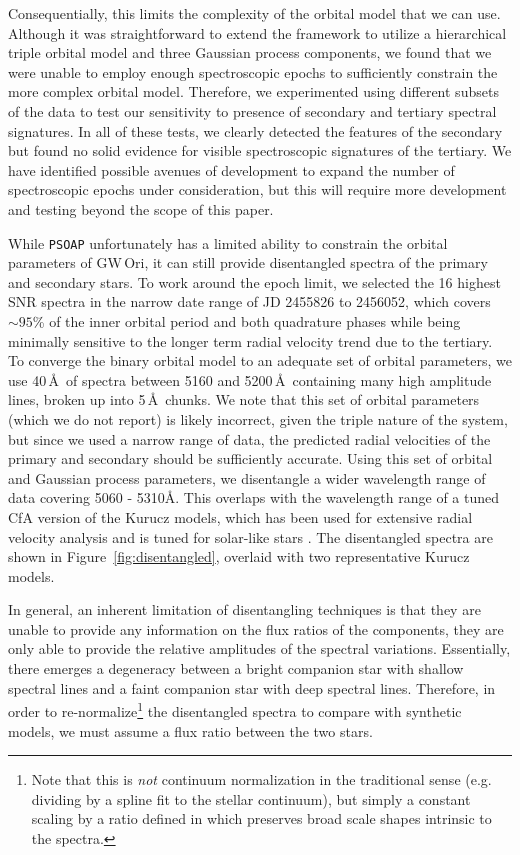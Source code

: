 \documentclass[twocolumn]{aastex61}
\newcommand{\gw}{GW\,Ori}
\begin{document}
Consequentially, this limits the complexity of the orbital model that we can use. Although it was straightforward to extend the framework to utilize a hierarchical triple orbital model and three Gaussian process components, we found that we were unable to employ enough spectroscopic epochs to sufficiently constrain the more complex orbital model. Therefore, we experimented using different subsets of the data to test our sensitivity to presence of secondary and tertiary spectral signatures. In all of these tests, we clearly detected the features of the secondary but found no solid evidence for visible spectroscopic signatures of the tertiary. We have identified possible avenues of development to expand the number of spectroscopic epochs under consideration, but this will require more development and testing beyond the scope of this paper.


While \texttt{PSOAP} unfortunately has a limited ability to constrain the orbital parameters of \gw, it can still provide disentangled spectra of the primary and secondary stars. To work around the epoch limit, we selected the 16 highest SNR spectra in the narrow date range of JD 2455826 to 2456052, which covers $\sim 95$\% of the inner orbital period and both quadrature phases while being minimally sensitive to the longer term radial velocity trend due to the tertiary. To converge the binary orbital model to an adequate set of orbital parameters, we use 40\,\AA\ of spectra between 5160 and 5200\,\AA\ containing many high amplitude lines, broken up into 5\,\AA\ chunks. We note that this set of orbital parameters (which we do not report) is likely incorrect, given the triple nature of the system, but since we used a narrow range of data, the predicted radial velocities of the primary and secondary should be sufficiently accurate. Using this set of orbital and Gaussian process parameters, we disentangle a wider wavelength range of data covering 5060 - 5310\AA. This overlaps with the wavelength range of a tuned CfA version of the Kurucz models, which has been used for extensive radial velocity analysis and is tuned for solar-like stars \citep{buchhave12}. The disentangled spectra are shown in Figure~\ref{fig:disentangled}, overlaid with two representative Kurucz models.

In general, an inherent limitation of disentangling techniques is that they are unable to provide any information on the flux ratios of the components, they are only able to provide the relative amplitudes of the spectral variations. Essentially, there emerges a degeneracy between a bright companion star with shallow spectral lines and a faint companion star with deep spectral lines. Therefore, in order to re-normalize\footnote{Note that this is \emph{not} continuum normalization in the traditional sense (e.g. dividing by a spline fit to the stellar continuum), but simply a constant scaling by a ratio defined in \citet[Eqn. 32]{czekala17} which preserves broad scale shapes intrinsic to the spectra.} the disentangled spectra to compare with synthetic models, we must assume a flux ratio between the two stars.
\end{document}
